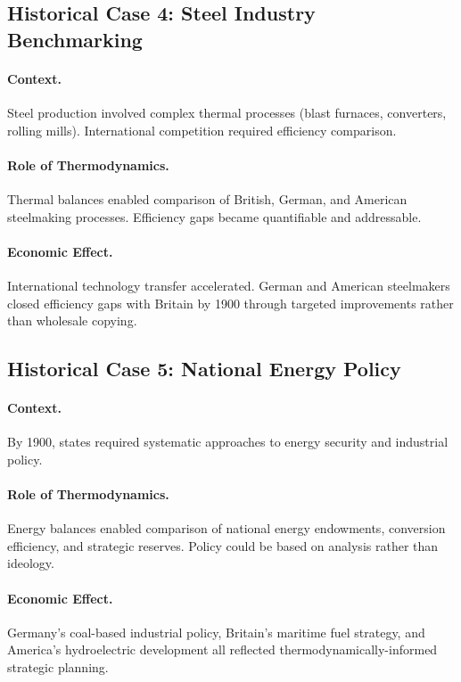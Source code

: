 \subsection{Historical Case 4: Steel Industry Benchmarking}

\paragraph{Context.} Steel production involved complex thermal processes
(blast furnaces, converters, rolling mills). International competition
required efficiency comparison.

\paragraph{Role of Thermodynamics.} Thermal balances enabled comparison of
British, German, and American steelmaking processes. Efficiency gaps became
quantifiable and addressable.

\paragraph{Economic Effect.} International technology transfer accelerated.
German and American steelmakers closed efficiency gaps with Britain by 1900
through targeted improvements rather than wholesale copying.

\subsection{Historical Case 5: National Energy Policy}

\paragraph{Context.} By 1900, states required systematic approaches to energy
security and industrial policy.

\paragraph{Role of Thermodynamics.} Energy balances enabled comparison of
national energy endowments, conversion efficiency, and strategic reserves.
Policy could be based on analysis rather than ideology.

\paragraph{Economic Effect.} Germany's coal-based industrial policy, Britain's
maritime fuel strategy, and America's hydroelectric development all reflected
thermodynamically-informed strategic planning.


